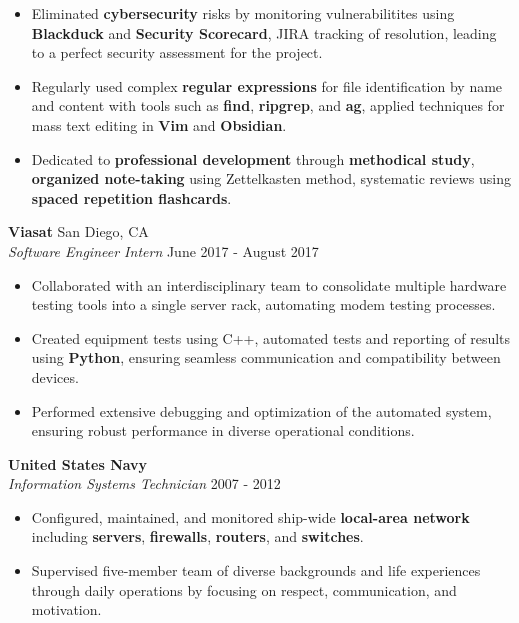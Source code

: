 \documentclass[a4paper]{article}
\begin{document}
\begin{itemize}
	\item Eliminated \textbf{cybersecurity} risks by monitoring vulnerabilitites using \textbf{Blackduck} and \textbf{Security Scorecard}, JIRA tracking of resolution, leading to a perfect security assessment for the project.
	\item Regularly used complex \textbf{regular expressions} for file identification by name and content with tools such as \textbf{find}, \textbf{ripgrep}, and \textbf{ag}, applied techniques for mass text editing in \textbf{Vim} and \textbf{Obsidian}.
	\item Dedicated to \textbf{professional development} through \textbf{methodical study}, \textbf{organized note-taking} using Zettelkasten method, systematic reviews using \textbf{spaced repetition flashcards}.
\end{itemize}

\vspace{-1mm}
\textbf{Viasat} \hfill San Diego, CA\\
\textit{Software Engineer Intern} \hfill June 2017 - August 2017\\
\vspace{-1mm}
\begin{itemize} \itemsep 1pt
    \item Collaborated with an interdisciplinary team to consolidate multiple hardware testing tools into a single server rack, automating modem testing processes.
    \item Created equipment tests using C++, automated tests and reporting of results using \textbf{Python}, ensuring seamless communication and compatibility between devices.
    \item Performed extensive debugging and optimization of the automated system, ensuring robust performance in diverse operational conditions.
\end{itemize}

\textbf{United States Navy} \hfill \\
\textit{Information Systems Technician} \hfill 2007 - 2012\\
\vspace{-1mm}
\begin{itemize} \itemsep 1pt
	\item Configured, maintained, and monitored ship-wide \textbf{local-area network} including \textbf{servers}, \textbf{firewalls}, \textbf{routers}, and \textbf{switches}.
	\item Supervised five-member team of diverse backgrounds and life experiences through daily operations by focusing on respect, communication, and motivation.
\end{itemize}
\end{document}
